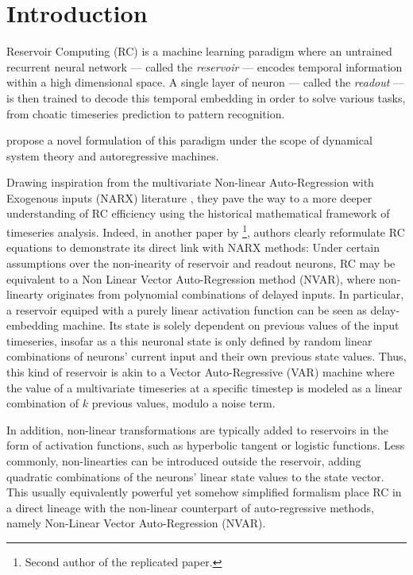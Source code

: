 
\newcommand{\todo}[1]{{\color{blue} TODO: #1}}

\section{Introduction}

Reservoir Computing (RC) is a machine learning paradigm where
an untrained recurrent neural network --- called the \emph{reservoir} --- encodes
temporal information within a high dimensional space.
A single layer of neuron --- called the \emph{readout} ---
is then trained to decode this temporal embedding in order
to solve various tasks, from choatic timeseries prediction to pattern recognition.


\citet{gauthier2021next} propose a novel formulation of this paradigm under
the scope of dynamical system theory and autoregressive machines.

Drawing inspiration from the multivariate
Non-linear Auto-Regression with Exogenous inputs (NARX) literature \cite{billings2013},
they pave the way to a more deeper understanding of RC efficiency using
the historical mathematical framework of timeseries analysis. Indeed, in another paper by \citet{bollt2021}
\footnote{Second author of the replicated paper.}, authors clearly reformulate RC equations to demonstrate
its direct link with NARX methods: Under certain assumptions over the non-inearity of reservoir and readout neurons,
RC may be equivalent to a Non Linear Vector Auto-Regression method (NVAR), where non-linearty originates
from polynomial combinations of delayed inputs. In particular, a reservoir equiped with a purely
linear activation function can be seen as delay-embedding machine. Its state is solely
dependent on previous values of the input timeseries, insofar as a this neuronal state is only defined by random linear
combinations of neurons' current input and their own previous state values. Thus, this kind of reservoir is
akin to a Vector Auto-Regressive (VAR) machine where the value of a multivariate
timeseries at a specific timestep is modeled as a linear combination of $k$ previous values, modulo a noise term.

In addition, non-linear transformations are typically added to reservoirs in the form of activation functions,
such as hyperbolic tangent or logistic functions. Less commonly, non-linearties can be introduced
outside the reservoir, adding quadratic combinations of the neurons' linear state values to the state vector.
This usually equivalently powerful yet somehow simplified formalism place
RC in a direct lineage with the non-linear counterpart of auto-regressive methods,
namely Non-Linear Vector Auto-Regression (NVAR).

